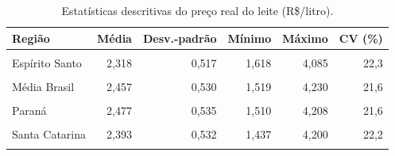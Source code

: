 \begin{table}[!h]
\centering
\caption{\label{tab:descritiva}Estatísticas descritivas do preço real do leite (R\$/litro).}
\centering
\fontsize{10}{12}\selectfont
\begin{tabular}[t]{lrrrrr}
\toprule
\textbf{Região} & \textbf{Média} & \textbf{Desv.-padrão} & \textbf{Mínimo} & \textbf{Máximo} & \textbf{CV (\%)}\\
\midrule
\cellcolor{gray!10}{Bahia} & \cellcolor{gray!10}{2,293} & \cellcolor{gray!10}{0,455} & \cellcolor{gray!10}{1,580} & \cellcolor{gray!10}{3,407} & \cellcolor{gray!10}{19,8}\\
Espírito Santo & 2,318 & 0,517 & 1,618 & 4,085 & 22,3\\
\cellcolor{gray!10}{Goiás} & \cellcolor{gray!10}{2,465} & \cellcolor{gray!10}{0,585} & \cellcolor{gray!10}{1,399} & \cellcolor{gray!10}{4,400} & \cellcolor{gray!10}{23,7}\\
Média Brasil & 2,457 & 0,530 & 1,519 & 4,230 & 21,6\\
\cellcolor{gray!10}{Minas Gerais} & \cellcolor{gray!10}{2,497} & \cellcolor{gray!10}{0,540} & \cellcolor{gray!10}{1,555} & \cellcolor{gray!10}{4,272} & \cellcolor{gray!10}{21,6}\\
Paraná & 2,477 & 0,535 & 1,510 & 4,208 & 21,6\\
\cellcolor{gray!10}{Rio de Janeiro} & \cellcolor{gray!10}{2,433} & \cellcolor{gray!10}{0,541} & \cellcolor{gray!10}{1,512} & \cellcolor{gray!10}{4,010} & \cellcolor{gray!10}{22,2}\\
Santa Catarina & 2,393 & 0,532 & 1,437 & 4,200 & 22,2\\
\cellcolor{gray!10}{São Paulo} & \cellcolor{gray!10}{2,508} & \cellcolor{gray!10}{0,515} & \cellcolor{gray!10}{1,655} & \cellcolor{gray!10}{4,146} & \cellcolor{gray!10}{20,5}\\
\bottomrule
\end{tabular}
\end{table}
